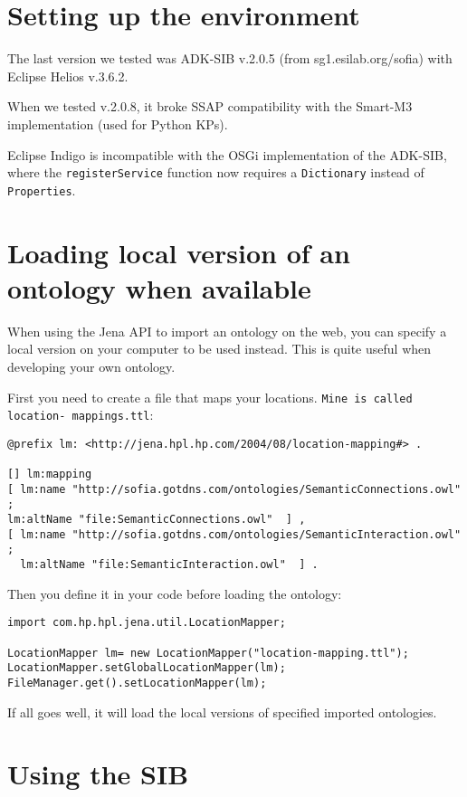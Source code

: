 \section{Setting up the environment}

The last version we tested was ADK-SIB v.2.0.5 (from sg1.esilab.org/sofia) with Eclipse Helios v.3.6.2.

When we tested v.2.0.8, it broke SSAP compatibility with the Smart-M3 implementation (used for Python KPs).

Eclipse Indigo is incompatible with the OSGi implementation of the ADK-SIB, where the \texttt{registerService} function now requires a \texttt{Dictionary} instead of \texttt{Properties}.

\section{Loading local version of an ontology when available}

When using the Jena API to import an ontology on the web, you can specify a local version on your computer to be used instead. This is quite useful when developing your own ontology.

First you need to create a file that maps your locations. \texttt{Mine is called location- 
mappings.ttl}: 

\begin{verbatim}
@prefix lm: <http://jena.hpl.hp.com/2004/08/location-mapping#> . 

[] lm:mapping 
[ lm:name "http://sofia.gotdns.com/ontologies/SemanticConnections.owl" ; 
lm:altName "file:SemanticConnections.owl"  ] , 
[ lm:name "http://sofia.gotdns.com/ontologies/SemanticInteraction.owl" ; 
  lm:altName "file:SemanticInteraction.owl"  ] . 
\end{verbatim}

Then you define it in your code before loading the ontology: 

\begin{verbatim}
import com.hp.hpl.jena.util.LocationMapper; 

LocationMapper lm= new LocationMapper("location-mapping.ttl"); 
LocationMapper.setGlobalLocationMapper(lm); 
FileManager.get().setLocationMapper(lm);
\end{verbatim}

If all goes well, it will load the local versions of specified imported ontologies.

\section{Using the SIB}

